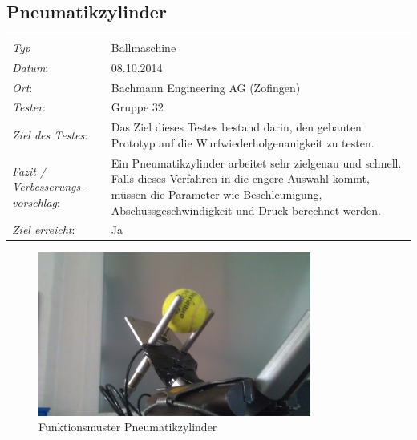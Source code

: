 \subsection{Pneumatikzylinder}

\begin{tabular}{p{3.6cm}p{9.4cm}}
\rule{0pt}{11pt}\textit{Typ}              & Ballmaschine \\ 
\rule{0pt}{11pt}\textit{Datum}:           & 08.10.2014   \\
\rule{0pt}{11pt}\textit{Ort}:             & Bachmann Engineering AG (Zofingen) \\
\rule{0pt}{11pt}\textit{Tester}:          & Gruppe 32\\
\rule{0pt}{11pt}\textit{Ziel des Testes}: & Das Ziel dieses Testes bestand darin, den gebauten Prototyp auf die Wurfwiederholgenauigkeit zu testen. \\
\rule{0pt}{11pt}\textit{Fazit / Verbesserungs-\newline vorschlag}: & Ein Pneumatikzylinder arbeitet sehr zielgenau und schnell. Falls dieses Verfahren in die engere Auswahl kommt, müssen die Parameter wie Beschleunigung, Abschussgeschwindigkeit und Druck berechnet werden.\\ 
\rule{0pt}{11pt}\textit{Ziel erreicht}:& Ja\\
\end{tabular}

\begin{figure}[h!]
	\includegraphics[width=0.8\textwidth]{Funktionstests/Bilder/PneumatikzylinderBild.jpg}
	\centering
	\caption{Funktionsmuster Pneumatikzylinder} 
\label{abb:PneumatikzylinderBild}
\end{figure}